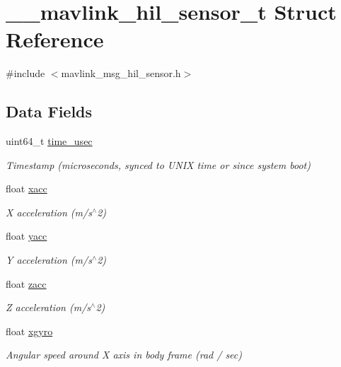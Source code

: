 \hypertarget{struct____mavlink__hil__sensor__t}{\section{\+\_\+\+\_\+mavlink\+\_\+hil\+\_\+sensor\+\_\+t Struct Reference}
\label{struct____mavlink__hil__sensor__t}
}


{\ttfamily \#include $<$mavlink\+\_\+msg\+\_\+hil\+\_\+sensor.\+h$>$}

\subsection*{Data Fields}
\begin{DoxyCompactItemize}
\item 
uint64\+\_\+t \hyperlink{struct____mavlink__hil__sensor__t_a45de41520af13fd33f21c82c72a98b75}{time\+\_\+usec}
\begin{DoxyCompactList}\small\item\em Timestamp (microseconds, synced to U\+N\+I\+X time or since system boot) \end{DoxyCompactList}\item 
float \hyperlink{struct____mavlink__hil__sensor__t_a20c3e6c7f8dd61b698cb617ec76c4b9d}{xacc}
\begin{DoxyCompactList}\small\item\em X acceleration (m/s$^\wedge$2) \end{DoxyCompactList}\item 
float \hyperlink{struct____mavlink__hil__sensor__t_a3649b04bdbc3d90b3c8da37b6ab02d6c}{yacc}
\begin{DoxyCompactList}\small\item\em Y acceleration (m/s$^\wedge$2) \end{DoxyCompactList}\item 
float \hyperlink{struct____mavlink__hil__sensor__t_acbecb9b5205c1b4fa0c43c2c45f78b4d}{zacc}
\begin{DoxyCompactList}\small\item\em Z acceleration (m/s$^\wedge$2) \end{DoxyCompactList}\item 
float \hyperlink{struct____mavlink__hil__sensor__t_a3b4035c288cba98923051942dfd85dc0}{xgyro}
\begin{DoxyCompactList}\small\item\em Angular speed around X axis in body frame (rad / sec) \end{DoxyCompactList}\item 

\end{DoxyCompactItemize}
